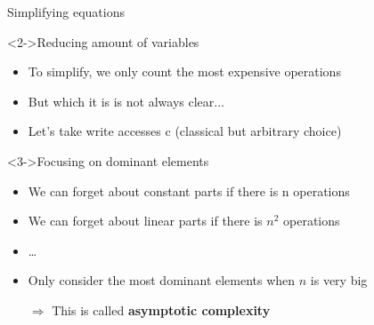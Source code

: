 \begin{frame}{Simplifying equations}

  \begin{block}<2->{Reducing amount of variables}
    \begin{itemize}
    \item To simplify, we only count the most expensive operations
    \item But which it is is not always clear...
    \item Let's take write accesses \alert{c} (classical but arbitrary choice)
    \end{itemize}
  \end{block}

  \begin{block}<3->{Focusing on dominant elements}
    \begin{itemize}
    \item We can forget about constant parts if there is n operations
    \item We can forget about linear parts if there is $n^2$ operations
    \item \ldots
    \item Only consider the most dominant elements when
      $n$ is very big
    \item[$\Rightarrow$] This is called \textbf{\alert{asymptotic complexity}}
    \end{itemize}
  \end{block}
\end{frame}
